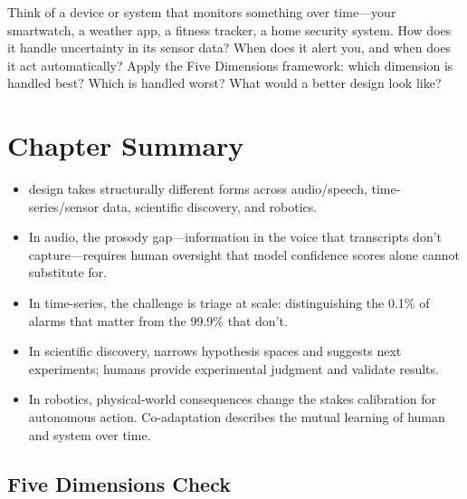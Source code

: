 \begin{trythis}
Think of a device or system that monitors something over time---your smartwatch, a weather app, a fitness tracker, a home security system. How does it handle uncertainty in its sensor data? When does it alert you, and when does it act automatically? Apply the Five Dimensions framework: which dimension is handled best? Which is handled worst? What would a better \hitl design look like?
\end{trythis}

\section*{Chapter Summary}

\begin{keyconcept}
\begin{itemize}
    \item \hitl design takes structurally different forms across audio/speech, time-series/sensor data, scientific discovery, and robotics.
    \item In audio, the prosody gap---information in the voice that transcripts don't capture---requires human oversight that model confidence scores alone cannot substitute for.
    \item In time-series, the challenge is triage at scale: distinguishing the 0.1\% of alarms that matter from the 99.9\% that don't.
    \item In scientific discovery, \ai narrows hypothesis spaces and suggests next experiments; humans provide experimental judgment and validate results.
    \item In robotics, physical-world consequences change the stakes calibration for autonomous action. Co-adaptation describes the mutual learning of human and system over time.
\end{itemize}
\end{keyconcept}

\subsection*{Five Dimensions Check}

